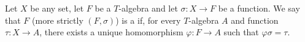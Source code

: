 Let $X$ be any set, let $F$ be a $T$-algebra and let $\sigma: X \rightarrow F$ be a function. We say that $F$ (more strictly $(F, \sigma)$) is a  if, for every $T$-algebra $A$ and function $\tau: X \rightarrow A$, there exists a unique homomorphism $\varphi: F \rightarrow A$ such that $\varphi \sigma = \tau$.
